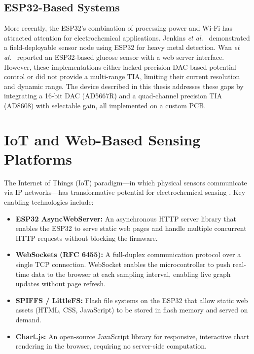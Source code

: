 \subsection{ESP32-Based Systems}

More recently, the ESP32's combination of processing power and Wi-Fi has attracted attention for electrochemical applications. Jenkins \textit{et al.}\ \cite{Jenkins2019} demonstrated a field-deployable sensor node using ESP32 for heavy metal detection. Wan \textit{et al.}\ \cite{Wan2020} reported an ESP32-based glucose sensor with a web server interface. However, these implementations either lacked precision DAC-based potential control or did not provide a multi-range TIA, limiting their current resolution and dynamic range. The device described in this thesis addresses these gaps by integrating a 16-bit DAC (AD5667R) and a quad-channel precision TIA (AD8608) with selectable gain, all implemented on a custom PCB.

\section{IoT and Web-Based Sensing Platforms}
\label{sec:iot}

The Internet of Things (IoT) paradigm---in which physical sensors communicate via IP networks---has transformative potential for electrochemical sensing \cite{Bandodkar2019}. Key enabling technologies include:

\begin{itemize}
    \item \textbf{ESP32 AsyncWebServer:} An asynchronous HTTP server library that enables the ESP32 to serve static web pages and handle multiple concurrent HTTP requests without blocking the firmware.
    \item \textbf{WebSockets (RFC 6455):} A full-duplex communication protocol over a single TCP connection. WebSocket enables the microcontroller to push real-time data to the browser at each sampling interval, enabling live graph updates without page refresh.
    \item \textbf{SPIFFS / LittleFS:} Flash file systems on the ESP32 that allow static web assets (HTML, CSS, JavaScript) to be stored in flash memory and served on demand.
    \item \textbf{Chart.js:} An open-source JavaScript library for responsive, interactive chart rendering in the browser, requiring no server-side computation.
\end{itemize}

